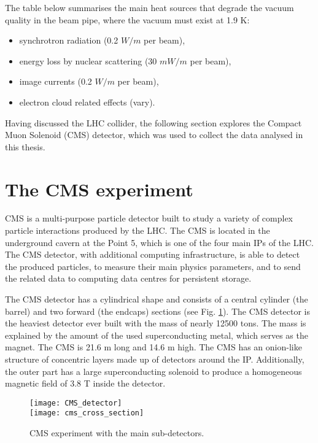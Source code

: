 \begin{normalsize}
The table below summarises the main heat sources that degrade the vacuum quality in the beam pipe, where the vacuum must exist at 1.9 K:


\begin{itemize}
\item synchrotron radiation (0.2 $W/m$ per beam),
\item energy loss by nuclear scattering (30 $mW/m$ per beam),
\item image currents (0.2 $W/m$ per beam),
\item electron cloud related effects (vary).
\end{itemize}



Having discussed the LHC collider, the following section explores the Compact Muon Solenoid (CMS) detector, which was used to collect the data analysed in this thesis. 


\section{The CMS experiment}

CMS is a multi-purpose particle detector built to study a variety of complex particle interactions produced by the LHC. The CMS is located in the underground cavern at the Point 5, which is one of the four main IPs of the LHC. The CMS detector, with additional computing infrastructure, is able to detect the produced particles, to measure their main physics parameters, and to send the related data to computing data centres for persistent storage. 


The CMS detector has a cylindrical shape and consists of a central cylinder (the barrel) and two forward (the endcaps) sections (see Fig. \ref{CMS_detector}). 
The CMS detector is the heaviest detector ever built with the mass of nearly 12500 tons. The mass is explained by the amount of the used superconducting metal, which serves as the magnet. The CMS is 21.6 m long and 14.6 m high. The CMS has an onion-like structure of concentric layers made up of detectors around the IP. Additionally, the outer part has a large superconducting solenoid to produce a homogeneous magnetic field of 3.8 T inside the detector.

\begin{figure}[H]
  \centering
  \texttt{[image: CMS\_detector]}\\
  \vspace{1cm}
  \texttt{[image: cms\_cross\_section]}
  \caption{CMS experiment with the main sub-detectors.}
  \label{CMS_detector}
\end{figure}



\end{normalsize}
